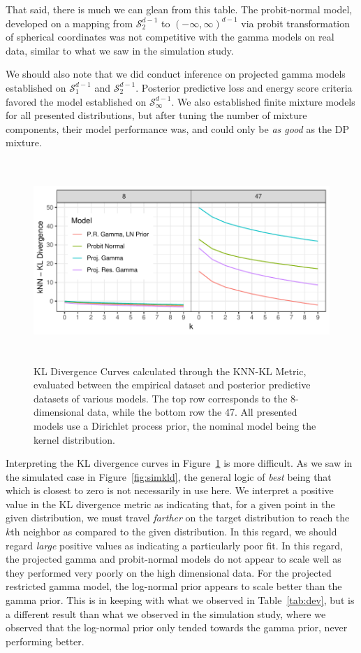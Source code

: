 That said, there is much we can glean from this table.  The probit-normal model, developed on a mapping
  from $\mathcal{S}_{2}^{d-1}$ to $(-\infty,\infty)^{d-1}$ via probit transformation of spherical coordinates
  was not competitive with the gamma models on real data, similar to what we saw in the simulation study.

We should also note that we did conduct inference on projected gamma models established on
  $\mathcal{S}_{1}^{d-1}$ and $\mathcal{S}_2^{d-1}$.  Posterior predictive loss and energy score criteria
  favored the model established on $\mathcal{S}_{\infty}^{d-1}$.  We also established finite mixture
  models for all presented distributions, but after tuning the number of mixture components, their
  model performance was, and could only be \emph{as good} as the DP mixture.

\begin{figure}[h]
  \centering
  \label{fig:knnkl}
  \includegraphics[width = 6in, height = 3in]{./images/knn_kl_divergence_curves}
  \caption{KL Divergence Curves calculated through the KNN-KL Metric, evaluated between the empirical
  dataset and posterior predictive datasets of various models.  The top row corresponds to the
  8-dimensional data, while the bottom row the 47.  All presented models use a Dirichlet process
  prior, the nominal model being the kernel distribution.}
\end{figure}

Interpreting the KL divergence curves in Figure~\ref{fig:knnkl} is more difficult.  As we saw in the
  simulated case in Figure~\ref{fig:simkld}, the general logic of \emph{best} being that which is
  closest to zero is not necessarily in use here.  We interpret a positive value in the KL divergence metric
  as indicating that, for a given point in the given distribution, we must travel \emph{farther} on
  the target distribution to reach the $k$th neighbor as compared to the given distribution.  In this
  regard, we should regard \emph{large} positive values as indicating a particularly poor fit.  In this
  regard, the projected gamma and probit-normal models do not appear to scale well as they performed
  very poorly on the high dimensional data.  For the projected restricted gamma model, the log-normal
  prior appears to scale better than the gamma prior.  This is in keeping with what we observed in
  Table~\ref{tab:dev}, but is a different result than what we observed in the simulation study, where
  we observed that the log-normal prior only tended towards the gamma prior, never performing better.

